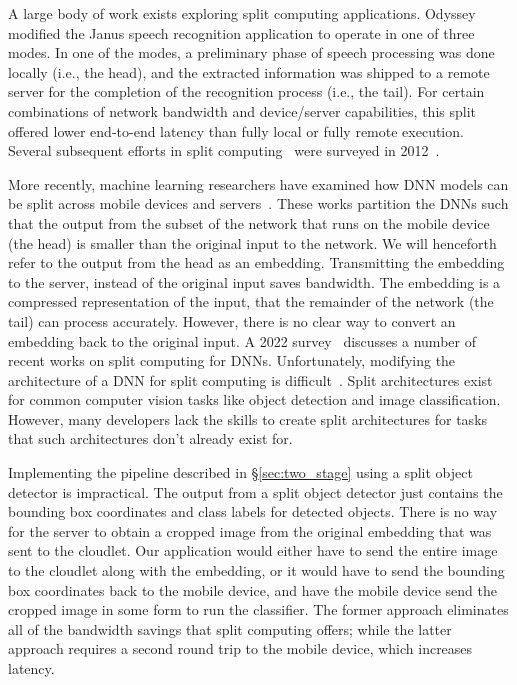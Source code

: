 A large body of work exists exploring split computing applications.
Odyssey~\cite{Noble1997} modified the Janus speech recognition application to
operate in one of three modes.
In one of the modes, a preliminary phase of speech
processing was done locally (i.e., the head), and the extracted
information was shipped to a remote server for the completion of the
recognition process (i.e., the tail).
For certain combinations of
network bandwidth and device/server capabilities, this split offered
lower end-to-end latency than fully local or fully remote execution.
Several subsequent efforts in split computing~\cite{Balan2002, Flinn2001,
  Flinn2003b, Narayanan2003, Goyal2004, Su2005, Ok2007, Balan2007,
  Kristensen2008} were surveyed in 2012~\cite{Flinn2012}.

More recently, machine learning researchers have examined how DNN models can be
split across mobile devices and servers~\cite{Kang2017, Hsu2019, Eshratifar2019,
  Matsubara2019}.
These works partition the DNNs such that the output from the subset of the
network that runs on the mobile device (the head) is smaller than the
original input to the network.
We will henceforth refer to the output from the head as an embedding.
Transmitting the embedding to the server, instead of the original input saves
bandwidth.
The embedding is a compressed representation of the input, that the remainder of
the network (the tail) can process accurately.
However, there is no clear way to convert an embedding back to the original
input.
A 2022 survey~\cite{Matsubara2022} discusses a number of recent works on split
computing for DNNs.
Unfortunately, modifying the architecture of a DNN for split computing is
difficult~\cite{Matsubara2020}.
Split architectures exist for common computer vision tasks like object detection
and image classification.
However, many developers lack the skills to create split architectures for tasks
that such architectures don't already exist for.

Implementing the pipeline described in \S\ref{sec:two_stage} using a split
object detector is impractical.
The output from a split object detector just contains the bounding box
coordinates and class labels for detected objects.
There is no way for the server to obtain a cropped image from the original
embedding that was sent to the cloudlet.
Our application would either have to send the entire image to the cloudlet along
with the embedding, or it would have to send the bounding box coordinates back
to the mobile device, and have the mobile device send the cropped image in some
form to run the classifier.
The former approach eliminates all of the bandwidth savings that split computing
offers; while the latter approach requires a second round trip to the mobile
device, which increases latency.

